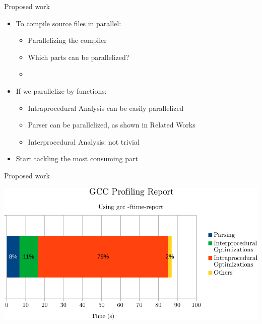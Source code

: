
\begin{frame}{Proposed work}

\begin{itemize}
    \item To compile source files in parallel:
    \begin{itemize}
        \item Parallelizing the compiler
        \item Which parts can be parallelized?
        \item[]
    \end{itemize}
    \item If we parallelize by functions:
    \begin{itemize}
        \item Intraprocedural Analysis can be easily parallelized
        \item Parser can be parallelized, as shown in Related Works
        \item Interprocedural Analysis: not trivial
    \end{itemize}
    \item Start tackling the most consuming part
\end{itemize}
\end{frame}


\begin{frame}{Proposed work}
\begin{center}
\includegraphics[scale=0.8]{figuras/profiling-crop.pdf}
\end{center}
\end{frame}


